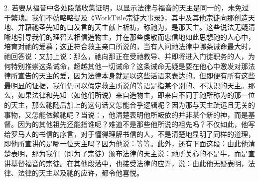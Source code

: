 2. 若要从福音中各处段落收集证明，以显示法律与福音的天主是同一的，未免过于繁琐。我们不妨略略提及《WorkTitle{宗徒大事录}》，其中及其他宗徒向那创造天地、并藉祂圣先知的口发言的天主献上祈祷，称祂为，是那天主。这些说法无疑清晰地引导我们的理智去相信造物主，并在那些虔敬而忠信地如此思想祂的人心中，培育对祂的爱慕；这正符合救主亲口所说的，当有人问祂法律中哪条诫命最大时，祂回答说：又加上说：那么，祂向那正在受祂教导、并即将进入门徒职务的人，为何特别推崇这条诫命，超越其他一切诫命？这条诫命无疑是要在他心中激发对那法律所宣告的天主的爱，因为法律本身就是以这些话语来表达的。但即便有所有这些最明显的证据，我们仍可以假定救主所说的等语是指某个别的、不认识的天主。那么，如果法律和先知（如他们所说）来自造物主，即来自不同于祂所称为的那一位的天主，那么祂随后加上的这句话又怎能合乎逻辑呢？因为那与天主疏远且无关的事物，又怎能依赖祂呢？当说：，他清楚表明他所皈依的并非某个新的神，而是基督。因为的其他祖先还能指谁呢？难道不是那些他所说的祖先吗？不仅如此，他写给罗马人的书信的序言，对于懂得理解书信的人，不是清楚地显明了同样的道理，即他所宣讲的是哪一位天主吗？因为他说：等等。此外，还有下面这段：由此他清楚表明，那为我们（即为了宗徒）颁布法律的天主说：祂所关心的不是牛，而是宣讲基督福音的宗徒。在其他段落中，也接受法律的应许，说：由此他无疑表明，法律、法律的天主以及祂的应许，都令他喜悦。\par


